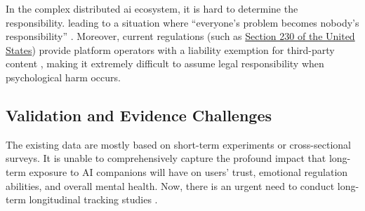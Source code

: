 In the complex distributed \gls{ai} ecosystem, it is hard to determine the responsibility. leading to a situation where ``everyone's problem becomes nobody's responsibility'' \cite[p.~1448]{devillers_ethical_2023}. Moreover, current regulations (such as \href{https://www.congress.gov/crs-product/R46751}{Section 230 of the United States}) provide platform operators with a liability exemption for third-party content \cite[p.~83]{branch_ai_2025}, making it extremely difficult to assume legal responsibility when psychological harm occurs.


\subsection{Validation and Evidence Challenges}

The existing data are mostly based on short-term experiments or cross-sectional surveys. It is unable to comprehensively capture the profound impact that long-term exposure to AI companions will have on users' trust, emotional regulation abilities, and overall mental health. Now, there is an urgent need to conduct long-term longitudinal tracking studies \cite[p.~22]{kim_i_2025}.


